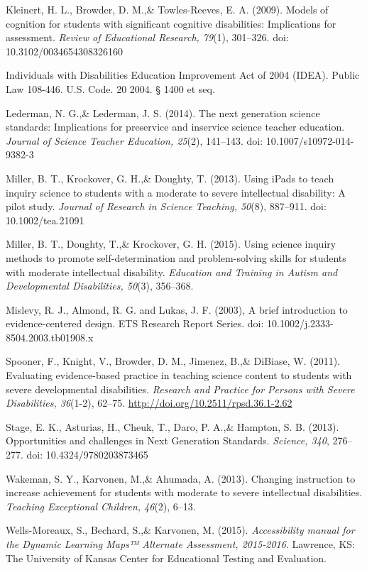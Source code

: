 \documentclass[11.5pt]{sig-alternate} %
\begin{document}
Kleinert, H. L., Browder, D. M.,\& Towles-Reeves, E. A. (2009). Models of cognition for students with significant cognitive disabilities: Implications for assessment. \textit{Review of Educational Research, 79}(1), 301–326. doi: 10.3102/0034654308326160

Individuals with Disabilities Education Improvement Act of 2004 (IDEA). Public Law 108-446. U.S. Code. 20 2004. § 1400 et seq. 

Lederman, N. G.,\& Lederman, J. S. (2014). The next generation science standards: Implications for preservice and inservice science teacher education. \textit{Journal of Science Teacher Education, 25}(2), 141–143. doi: 10.1007/s10972-014-9382-3

Miller, B. T., Krockover, G. H.,\& Doughty, T. (2013). Using iPads to teach inquiry science to students with a moderate to severe intellectual disability: A pilot study. \textit{Journal of Research in Science Teaching, 50}(8), 887–911. doi: 10.1002/tea.21091

Miller, B. T., Doughty, T.,\& Krockover, G. H. (2015). Using science inquiry methods to promote self-determination and problem-solving skills for students with moderate intellectual disability. \textit{Education and Training in Autism and Developmental Disabilities, 50}(3), 356–368.

Mislevy, R. J., Almond, R. G. and Lukas, J. F. (2003), A brief introduction to evidence-centered design. ETS Research Report Series. doi: 10.1002/j.2333-8504.2003.tb01908.x

Spooner, F., Knight, V., Browder, D. M., Jimenez, B.,\& DiBiase, W. (2011). Evaluating evidence-based practice in teaching science content to students with severe developmental disabilities. \textit{Research and Practice for Persons with Severe Disabilities, 36}(1-2), 62–75. \url{http://doi.org/10.2511/rpsd.36.1-2.62} 

Stage, E. K., Asturias, H., Cheuk, T., Daro, P. A.,\& Hampton, S. B. (2013). Opportunities and challenges in Next Generation Standards. \textit{Science, 340}, 276–277. doi: 10.4324/9780203873465

Wakeman, S. Y., Karvonen, M.,\& Ahumada, A. (2013). Changing instruction to increase achievement for students with moderate to severe intellectual disabilities. \textit{Teaching Exceptional Children, 46}(2), 6–13.

Wells-Moreaux, S., Bechard, S.,\& Karvonen, M. (2015). \textit{Accessibility manual for the Dynamic Learning Maps™ Alternate Assessment, 2015-2016}. Lawrence, KS: The University of Kansas Center for Educational Testing and Evaluation.
\clearpage
\leftskip 0in
\parindent 0in 
\end{document}
